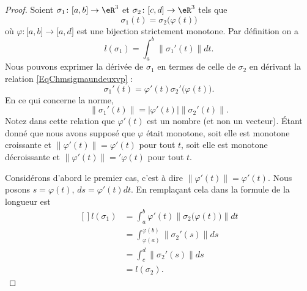 \begin{proof}
    Soient $\sigma_1\colon \mathopen[ a , b \mathclose]\to \eR^3$ et $\sigma_2\colon \mathopen[ c , d \mathclose]\to \eR^3$ tels que
    \begin{equation}     \label{EqChmsigmaundeuxvp}
        \sigma_1(t)=\sigma_2\big( \varphi(t) \big)
    \end{equation}
    où $\varphi\colon \mathopen[ a , b \mathclose]\to \mathopen[ a , d \mathclose]$ est une bijection strictement monotone. Par définition on a
    \begin{equation}
        l(\sigma_1)=\int_a^b\| \sigma_1'(t) \|dt.
    \end{equation}
    Nous pouvons exprimer la dérivée de $\sigma_1$ en termes de celle de $\sigma_2$ en dérivant la relation \eqref{EqChmsigmaundeuxvp} :
    \begin{equation}
        \sigma_1'(t)=\varphi'(t)\sigma_2'\big( \varphi(t) \big).
    \end{equation}
    En ce qui concerne la norme,
    \begin{equation}
        \| \sigma_1'(t) \|=| \varphi'(t) |\| \sigma_2'(t) \|.
    \end{equation}
    Notez dans cette relation que $\varphi'(t)$ est un nombre (et non un vecteur). Étant donné que nous avons supposé que $\varphi$ était monotone, soit elle est monotone croissante et $\| \varphi'(t) \|=\varphi'(t)$ pour tout $t$, soit elle est monotone décroissante et $\| \varphi'(t) \|='\varphi(t)$ pour tout $t$.

    Considérons d'abord le premier cas, c'est à dire $\| \varphi'(t) \|=\varphi'(t)$. Nous posons $s=\varphi(t)$, $ds=\varphi'(t)dt$. En remplaçant cela dans la formule de la longueur est
    \begin{equation}
        \begin{aligned}[]
            l(\sigma_1)&=\int_a^b\varphi'(t)\| \sigma_2\big( \varphi(t) \big) \|dt\\
            &=\int_{\varphi(a)}^{\varphi(b)}\| \sigma_2'(s) \|ds\\
            &=\int_c^d\| \sigma_2'(s) \|ds\\
            &=l(\sigma_2).
        \end{aligned}
    \end{equation}


\end{proof}

